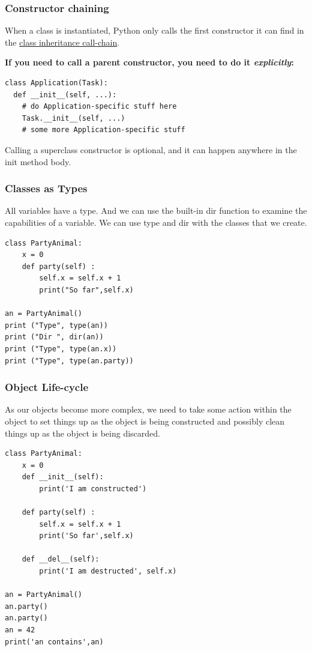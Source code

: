 \begin{frame}[fragile]\frametitle{Constructor chaining}

    When a class is instantiated, Python only calls the first
    constructor it can find in the
    \href{http://www.python.org/download/releases/2.3/mro/}{class inheritance call-chain}.

    \textbf{If you need to call a parent constructor, you need
      to do it \emph{explicitly}:}
    \begin{lstlisting}
class Application(Task):
  def __init__(self, ...):
    # do Application-specific stuff here
    Task.__init__(self, ...)
    # some more Application-specific stuff
    \end{lstlisting}

    Calling a superclass constructor is optional, and
    it can happen anywhere in the init method body.
\end{frame}


\begin{frame}[fragile]\frametitle{Classes as Types}
All variables have a type. And we can use the built-in
dir function to examine the capabilities of a variable. We can use type and dir
with the classes that we create.
\begin{lstlisting}
class PartyAnimal:
	x = 0
	def party(self) :
		self.x = self.x + 1
		print("So far",self.x)

an = PartyAnimal()
print ("Type", type(an))
print ("Dir ", dir(an))
print ("Type", type(an.x))
print ("Type", type(an.party))
\end{lstlisting}
\end{frame}

\begin{frame}[fragile]\frametitle{Object Life-cycle}
As our objects become more complex, we need to take some action within the object to set things up as
the object is being constructed and possibly clean things up as the object is being
discarded.
\begin{lstlisting}
class PartyAnimal:
	x = 0
	def __init__(self):
		print('I am constructed')
	
	def party(self) :
		self.x = self.x + 1
		print('So far',self.x)

	def __del__(self):
		print('I am destructed', self.x)

an = PartyAnimal()
an.party()
an.party()
an = 42
print('an contains',an)
\end{lstlisting}
\end{frame}

